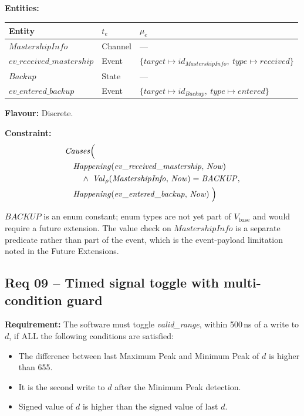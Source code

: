 \medskip
\textbf{Entities:}
\begin{center}
\begin{tabular}{lll}
    \toprule
    \textbf{Entity} & $t_e$ & $\mu_e$ \\
    \midrule
    $\mathit{MastershipInfo}$ & Channel & --- \\
    $\mathit{ev\_received\_mastership}$ & Event & $\{\mathit{target} \mapsto id_{\mathit{MastershipInfo}},\ \mathit{type} \mapsto \mathit{received}\}$ \\
    $\mathit{Backup}$ & State & --- \\
    $\mathit{ev\_entered\_backup}$ & Event & $\{\mathit{target} \mapsto id_{\mathit{Backup}},\ \mathit{type} \mapsto \mathit{entered}\}$ \\
    \bottomrule
\end{tabular}
\end{center}

\textbf{Flavour:} Discrete.

\textbf{Constraint:}
\begin{align*}
    &\mathit{Causes}\Bigl( \\
    &\quad \mathit{Happening}(\mathit{ev\_received\_mastership},\, \mathit{Now}) \\
    &\qquad \land\; \mathit{Val}_\rho(\mathit{MastershipInfo},\, \mathit{Now}) = \mathit{BACKUP}, \\
    &\quad \mathit{Happening}(\mathit{ev\_entered\_backup},\, \mathit{Now})
    \;\Bigr)
\end{align*}

$\mathit{BACKUP}$ is an enum constant; enum types are not yet part of $V_{\text{base}}$ and would require a future extension.
The value check on $\mathit{MastershipInfo}$ is a separate predicate rather than part of the event, which is the event-payload limitation noted in the Future Extensions.


\subsection{Req 09 -- Timed signal toggle with multi-condition guard}

\textbf{Requirement:} The software must toggle \textit{valid\_range}, within 500\,ns of a write to $d$, if ALL the following conditions are satisfied:
\begin{itemize}
    \item The difference between last Maximum Peak and Minimum Peak of $d$ is higher than 655.
    \item It is the second write to $d$ after the Minimum Peak detection.
    \item Signed value of $d$ is higher than the signed value of last $d$.
\end{itemize}


